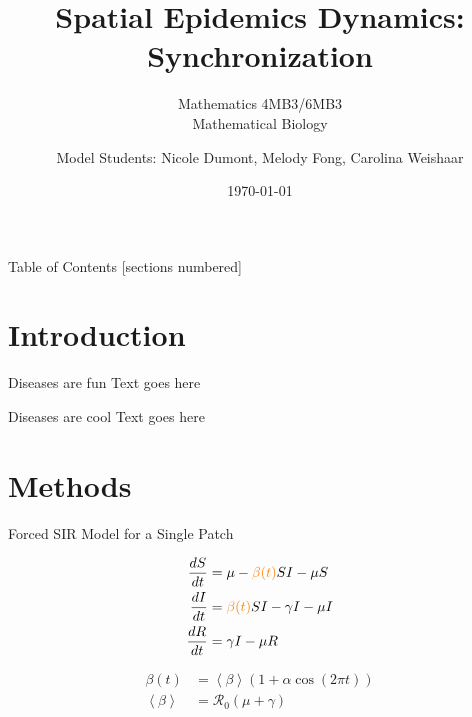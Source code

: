 \documentclass{beamer}\usepackage[]{graphicx}\usepackage[]{color}
\title{Spatial Epidemics Dynamics: Synchronization}
\subtitle{Mathematics 4MB3/6MB3\\Mathematical Biology}
\date{\today}
\author{Model Students: Nicole Dumont, Melody Fong, Carolina Weishaar}
\begin{document}
  \maketitle
  
\begin{frame}{Table of Contents}
  [sections numbered]
  \tableofcontents[hideallsubsections]
\end{frame}

  \section{Introduction}
  \begin{frame}{Diseases are fun}
    Text goes here
  \end{frame}
  \begin{frame}{Diseases are cool}
    Text goes here
  \end{frame}
  
  \section{Methods}
    \begin{frame}{Forced SIR Model for a Single Patch}
  \begin{center}
\begin{align*}
  \frac{dS}{dt} &= \mu -\textcolor{orange}{\beta(t)} S I -\mu S \\ 
  \frac{dI}{dt} &= \textcolor{orange}{\beta(t)} S I -\gamma I - \mu I \\
  \frac{dR}{dt} &= \gamma I -\mu R
\end{align*}

\begin{alertblock}{
\begin{align*}
  \beta(t) &= \left < \beta \right > (1+\alpha \cos(2\pi t)) \\
  \left < \beta \right > &= \mathcal{R}_0 (\mu + \gamma)
\end{align*}
}\end{alertblock}
\end{center}
   \end{frame}
  
\end{document}
